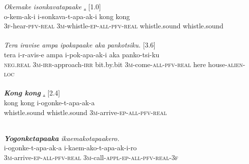 \documentclass[output=paper]{LSP/langsci}
\begin{document}
\begin{exe}
\ex \label{Em13ad}
\begin{xlist}
\ex \label{Emex:13a}
\glt \textit{Okemake isonkavatapaake \underline{.}} [1.0]\\
\gll o-kem-ak-i i-sonkava-t-apa-ak-i kong kong\\
 \textsc{3f-}hear\textsc{-pfv-real} \textsc{3m-}whistle\textsc{-ep-all-pfv-real} whistle.sound whistle.sound\\
\glt {}\\
\ex \label{Emex:13b}
\glt \textit{Tera iravise ampa ipokapaake aka pankotsiku.} [3.6]\\
\gll tera i-r-avis-e ampa i-pok-apa-ak-i aka panko-tsi-ku\\
 \textsc{neg.real} \textsc{3m-irr-}approach\textsc{-irr} bit.by.bit \textsc{3m-}come\textsc{-all-pfv-real} here house\textsc{-alien-loc}\\
\glt {}\\
\ex \label{Emex:13c}
\glt \textit{\textbf{Kong kong} \underline{.}} [2.4]\\
\gll kong kong i-ogonke-t-apa-ak-a\\
 whistle.sound whistle.sound \textsc{3m-}arrive\textsc{-ep-all-pfv-real}\\
\glt {}\\

\pagebreak

\ex \label{Emex:13d}
\glt \textit{\textbf{Yogonketapaaka} ikaemakotapaakero.}\\
\gll  i-ogonke-t-apa-ak-a i-kaem-ako-t-apa-ak-i-ro \\     	      
   \textsc{3m-}arrive\textsc{-ep-all-pfv-real} \textsc{3m-}call\textsc{-appl-ep-all-pfv-real-3f}\\
\glt {}
\end{xlist}
\end{exe}


%
\end{document}
